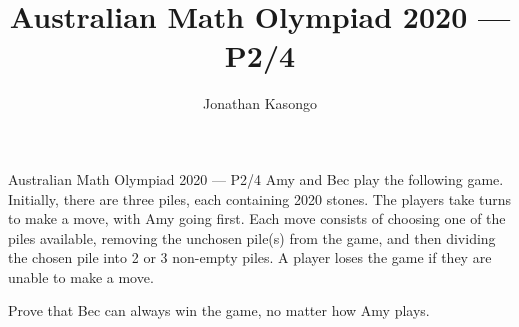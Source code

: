\documentclass{article}
\author{Jonathan Kasongo}
\title{Australian Math Olympiad 2020 --- P2/4}
\begin{document}
\maketitle

\begin{problem}{Australian Math Olympiad 2020 --- P2/4}
Amy and Bec play the following game. Initially, there are three piles, each containing
2020 stones. The players take turns to make a move, with Amy going first. Each
move consists of choosing one of the piles available, removing the unchosen pile(s)
from the game, and then dividing the chosen pile into 2 or 3 non-empty piles. A
player loses the game if they are unable to make a move.
\vspace{0.2cm}

Prove that Bec can always win the game, no matter how Amy plays.
\end{problem}
\end{document}
